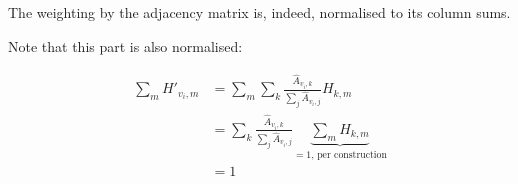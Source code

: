 The weighting by the adjacency matrix is, indeed, normalised to its column sums.

Note that this part is also normalised:

\begin{equation}
\begin{split}
	\sum_m H'_{v_i, m} & = \sum_m \sum_k \frac{\hat{A}_{v_i, k}}{\sum_j \hat{A}_{v_i, j}} H_{k, m} \\
	& = \sum_k \frac{\hat{A}_{v_i, k}}{\sum_j \hat{A}_{v_i, j}} \underbrace{\sum_m H_{k,m}}_{=1\text{, per construction}} \\
	& = 1
\end{split}
\end{equation}

\newpage
\raggedright
